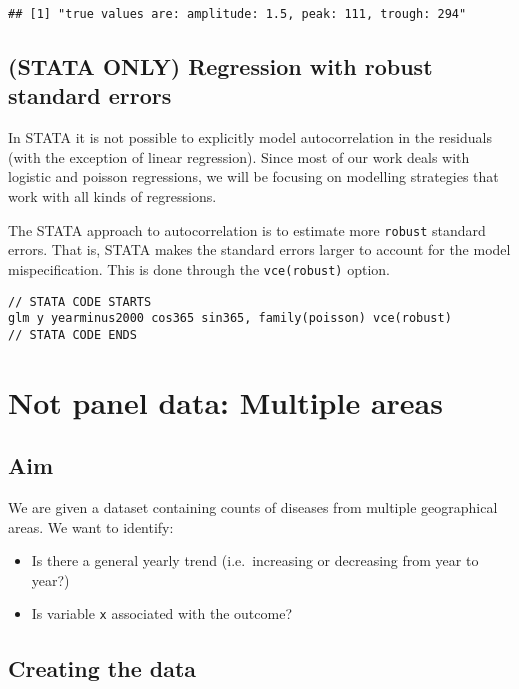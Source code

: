 \documentclass[]{book}
\providecommand{\tightlist}{%
  \setlength{\itemsep}{0pt}\setlength{\parskip}{0pt}}
\begin{document}
\begin{verbatim}
## [1] "true values are: amplitude: 1.5, peak: 111, trough: 294"
\end{verbatim}

\newpage

\section{(STATA ONLY) Regression with robust standard
errors}\label{stata-only-regression-with-robust-standard-errors}

In STATA it is not possible to explicitly model autocorrelation in the
residuals (with the exception of linear regression). Since most of our
work deals with logistic and poisson regressions, we will be focusing on
modelling strategies that work with all kinds of regressions.

The STATA approach to autocorrelation is to estimate more
\texttt{robust} standard errors. That is, STATA makes the standard
errors larger to account for the model mispecification. This is done
through the \texttt{vce(robust)} option.

\begin{verbatim}
// STATA CODE STARTS
glm y yearminus2000 cos365 sin365, family(poisson) vce(robust)
// STATA CODE ENDS
\end{verbatim}

\chapter{Not panel data: Multiple
areas}\label{not-panel-data-multiple-areas}

\section{Aim}\label{aim-2}

We are given a dataset containing counts of diseases from multiple
geographical areas. We want to identify:

\begin{itemize}
\tightlist
\item
  Is there a general yearly trend (i.e.~increasing or decreasing from
  year to year?)
\item
  Is variable \texttt{x} associated with the outcome?
\end{itemize}

\newpage

\section{Creating the data}\label{creating-the-data-2}
\end{document}
